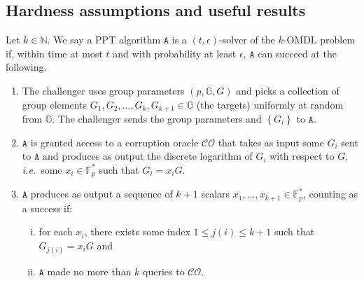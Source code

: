 \documentclass[draft]{llncs} %
\begin{document}
\subsection{Hardness assumptions and useful results}\label{sec:assumptions}
\begin{definition}\label{def:komdl}
Let $k \in \mathbb{N}$. We say a PPT algorithm $\texttt{A}$ is a $(t, \epsilon)$-solver of the $k$-OMDL problem if, within time at most $t$ and with probability at least $\epsilon$, $\texttt{A}$ can succeed at the following.

\begin{enumerate}
\item The challenger uses group parameters $(p, \mathbb{G}, G)$ and picks a collection of group elements $G_1, G_2, \ldots, G_{k}, G_{k+1} \in \mathbb{G}$ (the targets) uniformly at random from $\mathbb{G}$. The challenger sends the group parameters and $\left\{G_i\right\}$ to $\texttt{A}$.

\item $\texttt{A}$ is granted access to a corruption oracle $\mathcal{CO}$ that takes as input some $G_i$ sent to $\texttt{A}$ and produces as output the discrete logarithm of $G_i$ with respect to $G$, \textit{i.e.}\ some $x_i \in \mathbb{F}_p^*$ such that $G_i = x_i G$.

\item $\texttt{A}$ produces as output a sequence of $k+1$ scalars $x_1, \ldots, x_{k+1} \in \mathbb{F}_p^*$, counting as a success if:
\begin{enumerate}[(i)]
\item for each $x_i$, there exists some index $1 \leq j(i) \leq k+1$ such that $G_{j(i)} = x_iG$ and
\item $\texttt{A}$ made no more than $k$ queries to $\mathcal{CO}$.
\end{enumerate}
\end{enumerate}
\end{definition}
\end{document}
